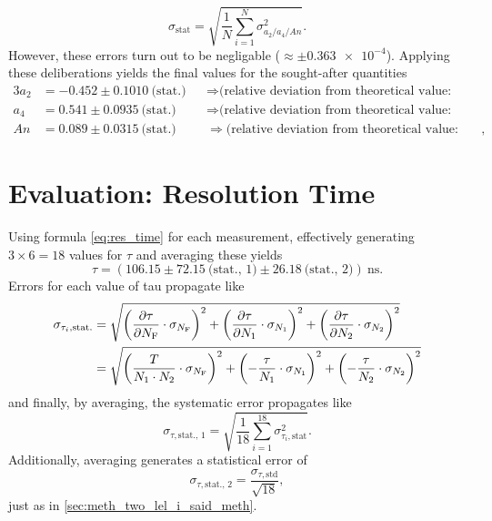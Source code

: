 \begin{equation*}
	\sigma_\text{stat} = \sqrt{\frac{1}{N}\sum_{i=1}^N\sigma_\text{$a_2/a_4/An$}^2}.
\end{equation*}
However, these errors turn out to be negligable ($\approx\pm\num{0.363e-4}$).
Applying these deliberations yields the final values for the sought-after quantities
\begin{alignat*}{3}
 a_2 &= \num{-0.452}\pm\num{0.1010}\ \text{(stat.)} &&\Rightarrow \text{(relative deviation from theoretical value: 461.48\%)}\\
 a_4 &= \num{0.541}\pm\num{0.0935}\ \text{(stat.)}  &&\Rightarrow \text{(relative deviation from theoretical value: 1197.27\%)} \\
 An  &= \num{0.089}\pm\num{0.0315}\ \text{(stat.)}   &&\Rightarrow \text{(relative deviation from theoretical value: 46.90\%)},
\end{alignat*}

\section{Evaluation: Resolution Time}
Using formula \ref{eq:res_time} for each measurement, effectively generating $3\times 6 = 18$ values for $\tau$ and averaging these yields
\begin{equation*}
	\tau = (\num{106.15}\pm\num{72.15}\ \text{(stat., 1)}\pm \num{26.18}\ \text{(stat., 2)})\ \si{\ns}.
\end{equation*}
Errors for each value of tau propagate like
\begin{align*}
	\sigma_{\tau_i,\text{stat.}} &= \sqrt{\left(\frac{\partial \tau}{\partial N_\text{F}}\cdot\sigma_{N_\text{F}}\right)^2 + \left(\frac{\partial \tau}{\partial N_1}\cdot\sigma_{N_1}\right)^2 + \left(\frac{\partial \tau}{\partial N_2}\cdot\sigma_{N_2}\right)^2} \\
	&= \sqrt{ \left(\frac{T}{N_1\cdot N_2}\cdot\sigma_{N_\text{F}}\right)^2 + \left(-\frac{\tau}{N_1}\cdot\sigma_{N_1}\right)^2 + \left(-\frac{\tau}{N_2}\cdot\sigma_{N_2}\right)^2}
\end{align*}
and finally, by averaging, the systematic error propagates like
\begin{equation*}
	\sigma_{\tau,\text{stat., 1}} = \sqrt{\frac{1}{18}\sum_{i=1}^{18}\sigma_{\tau_i,\text{stat}}^2}.
\end{equation*}
Additionally, averaging generates a statistical error of
\begin{equation*}
	\sigma_{\tau,\text{stat., 2}} = \frac{\sigma_{\tau,\text{std}}}{\sqrt{18}},
\end{equation*}
just as in \autoref{sec:meth_two_lel_i_said_meth}.
